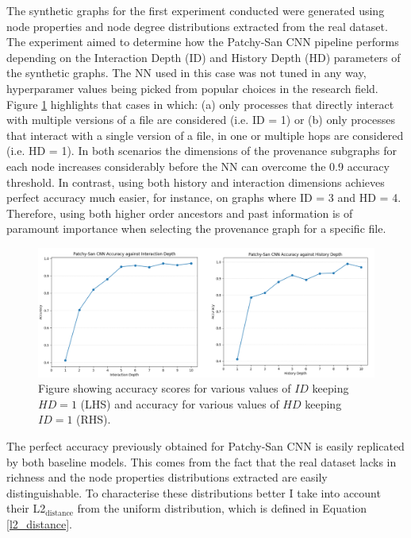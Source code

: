 The synthetic graphs for the first experiment conducted were generated using node properties and node degree distributions extracted from the real dataset. The experiment aimed to determine how the Patchy-San CNN pipeline performs depending on the Interaction Depth (ID) and History Depth (HD) parameters of the synthetic graphs. The NN used in this case was not tuned in any way, hyperparamer values being picked from popular choices in the research field. Figure \ref{inter_hist_depth_acc} highlights that cases in which: 
(a) only processes that directly interact with multiple versions of a file are considered (i.e. ID = 1) or (b) only processes that interact with a single version of a file, in one or multiple hops are considered (i.e. HD = 1). In both scenarios the dimensions of the provenance subgraphs for each node increases considerably before the NN can overcome the 0.9 accuracy threshold. In contrast, using both history and interaction dimensions achieves perfect accuracy much easier, for instance, on graphs where ID = 3 and HD = 4. Therefore, using both higher order ancestors and past information is of paramount importance when selecting the provenance graph for a specific file. 


\begin{figure}[H]
  \centering
  \centerline{\includegraphics[scale=0.475]{Images/inter_hist_deph_acc.png}}
  \caption{ Figure showing accuracy scores for various values of $ID$ keeping $HD = 1$ (LHS) and
    accuracy for various values of $HD$ keeping $ID = 1$ (RHS).}
  \label{inter_hist_depth_acc}
\end{figure}

The perfect accuracy previously obtained for Patchy-San CNN is easily replicated by both baseline models. This comes from the fact that the real dataset lacks in richness and the node properties distributions extracted are easily distinguishable. To characterise these distributions better I take into account their L2$_{\text{distance}}$ from the uniform distribution, which is defined in Equation \ref{l2_distance}.  

